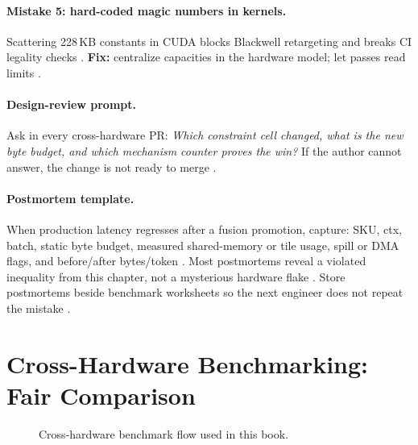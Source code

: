 \paragraph{Mistake 5: hard-coded magic numbers in kernels.}
Scattering 228\,KB constants in CUDA blocks Blackwell retargeting and breaks CI legality checks \citep{yirage2026,iree2024,nvidia2022hopper}.
\textbf{Fix:} centralize capacities in the hardware model; let passes read limits \citep{chen2020compilerbasedhardw}.

\paragraph{Design-review prompt.}
Ask in every cross-hardware PR: \emph{Which constraint cell changed, what is the new byte budget, and which mechanism counter proves the win?} \citep{taxbreak2026,memoryfloor2026,patel2025llminference}
If the author cannot answer, the change is not ready to merge \citep{yirage2026}.

\paragraph{Postmortem template.}
When production latency regresses after a fusion promotion, capture: SKU, ctx, batch, static byte budget, measured shared-memory or tile usage, spill or DMA flags, and before/after bytes/token \citep{memoryfloor2026,taxbreak2026,nvidia2022hopper}.
Most postmortems reveal a violated inequality from this chapter, not a mysterious hardware flake \citep{patel2025llminference,yirage2026}.
Store postmortems beside benchmark worksheets so the next engineer does not repeat the mistake \citep{chen2020compilerbasedhardw}.

\section{Cross-Hardware Benchmarking: Fair Comparison}
\label{sec:benchmark_method}

\begin{figure}[t]
\centering
{}
\caption{Cross-hardware benchmark flow used in this book.}
\label{fig:benchmark_method}
\end{figure}

